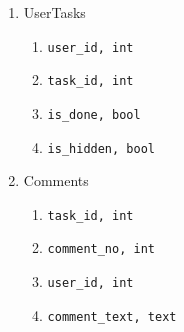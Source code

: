 \documentclass[12pt,a4paper,notitlepage]{article}
\begin{document}
\begin{enumerate}
\begin{enumerate}
    \end{enumerate}
\item UserTasks
    \begin{enumerate}
    \item \texttt{user\_id, int}
    \item \texttt{task\_id, int}
    \item \texttt{is\_done, bool}
    \item \texttt{is\_hidden, bool}
    \end{enumerate}
\item Comments
    \begin{enumerate}
    \item \texttt{task\_id, int}
    \item \texttt{comment\_no, int}
    \item \texttt{user\_id, int}
    \item \texttt{comment\_text, text}
    \end{enumerate}
\end{enumerate}
\end{document}
